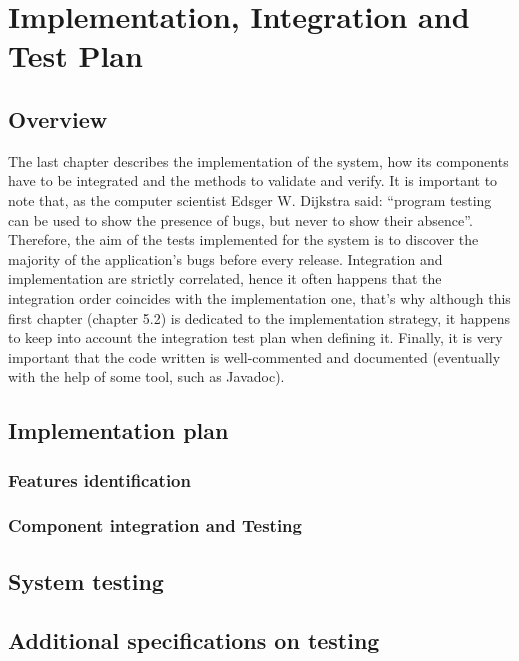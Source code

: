 \chapter{Implementation, Integration and Test Plan}
\section{Overview}
The last chapter describes the implementation of the system, how its components have to be
integrated and the methods to validate and verify. It is important to note that, as the
computer scientist Edsger W. Dijkstra said: “program testing can be used to show the
presence of bugs, but never to show their absence”. Therefore, the aim of the tests
implemented for the system is to discover the majority of the application’s bugs before every
release. Integration and implementation are strictly correlated, hence it often happens that
the integration order coincides with the implementation one, that’s why although this first
chapter (chapter 5.2) is dedicated to the implementation strategy, it happens to keep into
account the integration test plan when defining it. Finally, it is very important that the code
written is well-commented and documented (eventually with the help of some tool, such as
Javadoc).
\section{Implementation plan}
\subsection{Features identification}
\subsection{Component integration and Testing}
\section{System testing}
\section{Additional specifications on testing}